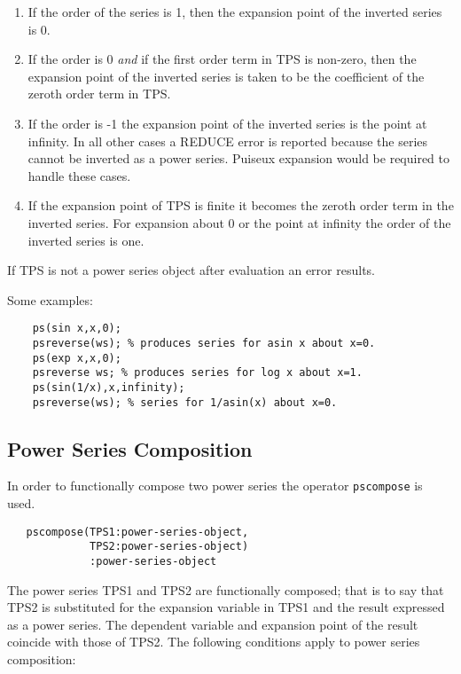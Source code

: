 \begin{enumerate}
\item If the order of the series is 1, then the expansion point of the
inverted series is 0.

\item If the order is 0 \emph{and} if the first order term in TPS
is non-zero, then the expansion point of the inverted series is taken
to be the coefficient of the zeroth order term in TPS.

\item If the order is -1 the expansion point of the inverted series
is the point at infinity.  In all other cases a REDUCE error is
reported because the series cannot be inverted as a power series.
Puiseux  expansion would be required to
handle these cases.

\item If the expansion point of TPS is finite it becomes the
zeroth order term in the inverted series. For expansion about 0 or the
point at infinity the order of the inverted series is one.
\end{enumerate}

If TPS is not a power series object after evaluation an error results.

Some examples:
\begin{verbatim}
    ps(sin x,x,0);
    psreverse(ws); % produces series for asin x about x=0.
    ps(exp x,x,0);
    psreverse ws; % produces series for log x about x=1.
    ps(sin(1/x),x,infinity);
    psreverse(ws); % series for 1/asin(x) about x=0.
\end{verbatim}

\subsection{Power Series Composition}
\hypertarget{operator:PSCOMPOSE}{}
In order to functionally compose two power series the operator
\texttt{pscompose} is used. 
\begin{verbatim}
   pscompose(TPS1:power-series-object,
             TPS2:power-series-object)
             :power-series-object
\end{verbatim}
The power series TPS1 and TPS2 are functionally composed;
that is to say that TPS2 is substituted for the expansion
variable in TPS1 and the result expressed as a power series. The
dependent variable and expansion point of the result coincide with
those of TPS2.  The following conditions apply to power series
composition:

